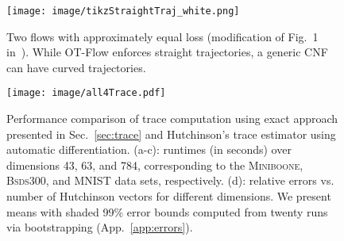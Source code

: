 \documentclass[letterpaper]{article}
\newcommand{\miniboone}{\textsc{Miniboone}}
\newcommand{\bsds}{\textsc{Bsds300}}
\newcommand{\model}{OT-Flow} %
\begin{document}
	\begin{figure}[t]
		\centering
		\texttt{[image: image/tikzStraightTraj\_white.png]}
		\caption{Two flows with approximately equal loss (modification of Fig.~1 in~\citealp{grathwohl2019ffjord,finlay2020train}). While \model{} enforces straight trajectories, a generic CNF can have curved trajectories.}
		\label{fig:pretty_cnf}    
	\end{figure}

	\begin{figure*}[t]
	  \centering
		\texttt{[image: image/all4Trace.pdf]}
	  \caption{Performance comparison of trace computation using exact approach presented in Sec.~\ref{sec:trace} and Hutchinson's trace estimator using automatic differentiation. (a-c): runtimes (in seconds) over dimensions 43, 63, and 784, corresponding to the \miniboone{}, \bsds{}, and MNIST data sets, respectively. (d): relative errors vs. number of Hutchinson vectors for different dimensions. We present means with shaded 99\% error bounds computed from twenty runs via bootstrapping (App.~\ref{app:errors}). }
	  \label{fig:trace_compare}
	\end{figure*}
\end{document}
